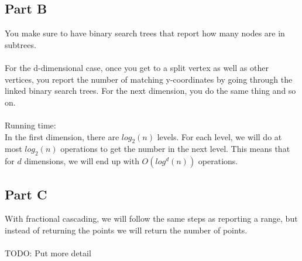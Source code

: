\documentclass[11pt,psfig]{article}
\begin{document}
\subsection*{Part B}

You make sure to have binary search trees that report how many nodes are in subtrees. \\
\\
For the d-dimensional case, once you get to a split vertex as well as other vertices, you report the number of matching y-coordinates by going through the linked binary search trees. For the next dimension, you do the same thing and so on. \\
\\
Running time:\\
In the first dimension, there are $log_2(n)$ levels. For each level, we will do at most $log_2(n)$ operations to get the number in the next level. This means that for $d$ dimensions, we will end up with $O(log^d(n))$ operations. 
\\

\subsection*{Part C}

With fractional cascading, we will follow the same steps as reporting a range, but instead of returning the points we will return the number of points. \\
\\
TODO: Put more detail
\end{document}

